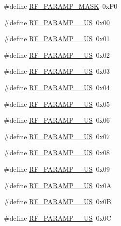 \begin{DoxyCompactItemize}
\item 
\#define \mbox{\hyperlink{sx1276_regs-_fsk_8h_acf298b5a57b53f2dbaabc1bf14b7e195}{R\+F\+\_\+\+P\+A\+R\+A\+M\+P\+\_\+\+M\+A\+SK}}~0x\+F0
\item 
\#define \mbox{\hyperlink{sx1276_regs-_fsk_8h_a7af19d4ba1da0302a8f0663928b03fb3}{R\+F\+\_\+\+P\+A\+R\+A\+M\+P\+\_\+\_\+\+US}}~0x00
\item 
\#define \mbox{\hyperlink{sx1276_regs-_fsk_8h_a19914e4184e2246e820f923f068b4a84}{R\+F\+\_\+\+P\+A\+R\+A\+M\+P\+\_\+\_\+\+US}}~0x01
\item 
\#define \mbox{\hyperlink{sx1276_regs-_fsk_8h_a8647a6bde6d158ce8a6209f0bcf939a5}{R\+F\+\_\+\+P\+A\+R\+A\+M\+P\+\_\+\_\+\+US}}~0x02
\item 
\#define \mbox{\hyperlink{sx1276_regs-_fsk_8h_a2b7aa0506166758344a48149bc647a19}{R\+F\+\_\+\+P\+A\+R\+A\+M\+P\+\_\+\_\+\+US}}~0x03
\item 
\#define \mbox{\hyperlink{sx1276_regs-_fsk_8h_ac09b8ab8fd2f894cff3f4ff744fc6afe}{R\+F\+\_\+\+P\+A\+R\+A\+M\+P\+\_\+\_\+\+US}}~0x04
\item 
\#define \mbox{\hyperlink{sx1276_regs-_fsk_8h_a503450550b5adc6b1a90f669560ce6e3}{R\+F\+\_\+\+P\+A\+R\+A\+M\+P\+\_\+\_\+\+US}}~0x05
\item 
\#define \mbox{\hyperlink{sx1276_regs-_fsk_8h_ab6436b7008237e768430e4341f3690c2}{R\+F\+\_\+\+P\+A\+R\+A\+M\+P\+\_\+\_\+\+US}}~0x06
\item 
\#define \mbox{\hyperlink{sx1276_regs-_fsk_8h_afdbd878cf8d71fc7847839ede51befcf}{R\+F\+\_\+\+P\+A\+R\+A\+M\+P\+\_\+\_\+\+US}}~0x07
\item 
\#define \mbox{\hyperlink{sx1276_regs-_fsk_8h_ac822b78122be23759c44a0ea4bafcee8}{R\+F\+\_\+\+P\+A\+R\+A\+M\+P\+\_\+\_\+\+US}}~0x08
\item 
\#define \mbox{\hyperlink{sx1276_regs-_fsk_8h_a8bf30d2871eb23126fcf129bc33e865d}{R\+F\+\_\+\+P\+A\+R\+A\+M\+P\+\_\+\_\+\+US}}~0x09
\item 
\#define \mbox{\hyperlink{sx1276_regs-_fsk_8h_ac52043271b89e70323e72d1075f0b6fe}{R\+F\+\_\+\+P\+A\+R\+A\+M\+P\+\_\+\_\+\+US}}~0x0A
\item 
\#define \mbox{\hyperlink{sx1276_regs-_fsk_8h_ad0dfe13e76f88d7ded3c3ef508d4d2ae}{R\+F\+\_\+\+P\+A\+R\+A\+M\+P\+\_\+\_\+\+US}}~0x0B
\item 
\#define \mbox{\hyperlink{sx1276_regs-_fsk_8h_a321fde6a82d665cb174086f7d532eff8}{R\+F\+\_\+\+P\+A\+R\+A\+M\+P\+\_\+\_\+\+US}}~0x0C
\item 

\end{DoxyCompactItemize}
